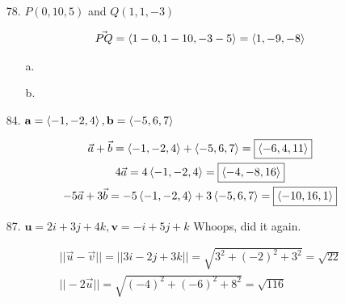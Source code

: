 \documentclass[10pt, letterpaper]{article}
\begin{document}
\begin{itemize}
        \pagebreak

        \item [78.] $P(0, 10, 5)$ and $Q(1, 1, -3)$
        
        \begin{mdframed}
            \begin{equation*}
                \begin{gathered}
                    \vec{PQ} = \expval{1 - 0, 1 - 10, -3 - 5} = \expval{1, -9, -8}
                \end{gathered}
            \end{equation*}
            \begin{itemize}
                \item [a.] 
                \item [b.] \boxed{\ihat, -9\jhat, -8\khat}
            \end{itemize}
        \end{mdframed}

        \item [84.] $\mathbf{a} = \expval{-1, -2, 4}, \mathbf{b} = \expval{-5, 6, 7}$
        
        \begin{mdframed}
            \begin{equation*}
                \begin{gathered}
                    \vec{a} + \vec{b} = \expval{-1, -2, 4} + \expval{-5, 6, 7} = \boxed{\expval{-6, 4, 11}} \\
                    4\vec{a} = 4\expval{-1, -2, 4} = \boxed{\expval{-4, -8, 16}}                            \\
                    -5\vec{a} + 3\vec{b} = -5\expval{-1, -2, 4}+3\expval{-5, 6, 7} = \boxed{\expval{-10, 16, 1}}
                \end{gathered}
            \end{equation*}
        \end{mdframed}

        \item [87.] $\mathbf{u} = 2i + 3j + 4k, \mathbf{v} = -i + 5j + k$ Whoops, did it again.
        
        \begin{mdframed}
            \begin{equation*}
                \begin{gathered}
                    ||\vec{u} - \vec{v}|| = ||3i - 2j + 3k|| = \sqrt{3^2 + (-2)^2 + 3^2} = \boxed{\sqrt{22}} \\
                    ||-2\vec{u}|| = \sqrt{(-4)^2 + (-6)^2 + 8^2} = \boxed{\sqrt{116}}
                \end{gathered}
            \end{equation*}
        \end{mdframed}


\end{itemize}
\end{document}
